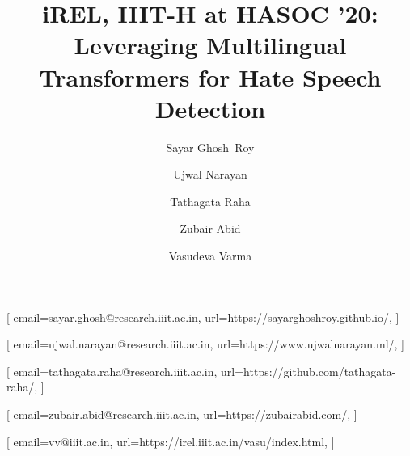 \documentclass[
]{ceurart}
\begin{document}


\title{iREL, IIIT-H at HASOC '20: Leveraging Multilingual Transformers for Hate Speech Detection}

\author{Sayar Ghosh\ Roy}[%
email=sayar.ghosh@research.iiit.ac.in,
url=https://sayarghoshroy.github.io/,
]

\author{Ujwal Narayan}[%
email=ujwal.narayan@research.iiit.ac.in,
url=https://www.ujwalnarayan.ml/,
]

\author{Tathagata Raha}[%
email=tathagata.raha@research.iiit.ac.in,
url=https://github.com/tathagata-raha/,
]

\author{Zubair Abid}[%
email=zubair.abid@research.iiit.ac.in,
url=https://zubairabid.com/,
]

\author{Vasudeva Varma}[%
email=vv@iiit.ac.in,
url=https://irel.iiit.ac.in/vasu/index.html,
]
\end{document}
